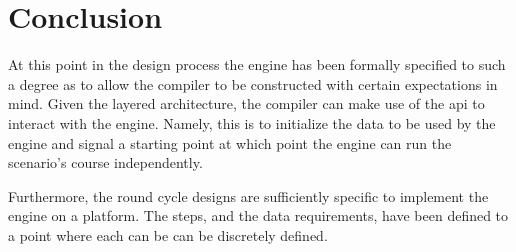 \section{Conclusion}
At this point in the design process the engine has been formally specified to such a degree as to allow the compiler to be constructed with certain expectations in mind. Given the layered architecture, the compiler can make use of the \ac{api} to interact with the engine. Namely, this is to initialize the data to be used by the engine and signal a starting point at which point the engine can run the scenario's course independently.

Furthermore, the round cycle designs are sufficiently specific to implement the engine on a platform. The steps, and the data requirements, have been defined to a point where each can be can be discretely defined.